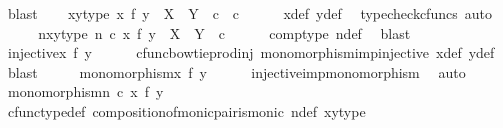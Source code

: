 \begin{isabellebody}
\ blast\isanewline
\ \ \isamarkupfalse%
\ xy{\isacharunderscore}{\kern0pt}type{\isacharcolon}{\kern0pt}\ {\isachardoublequoteopen}x\ {\isasymbowtie}\isactrlsub f\ y\ {\isacharcolon}{\kern0pt}\ X\ {\isasymCoprod}\ Y\ {\isasymrightarrow}\ {\isasymnat}\isactrlsub c\ {\isasymCoprod}\ {\isasymnat}\isactrlsub c{\isachardoublequoteclose}\isanewline
\ \ \ \ \isamarkupfalse%
\ x{\isacharunderscore}{\kern0pt}def\ y{\isacharunderscore}{\kern0pt}def\ \isamarkupfalse%
\ {\isacharparenleft}{\kern0pt}typecheck{\isacharunderscore}{\kern0pt}cfuncs{\isacharcomma}{\kern0pt}\ auto{\isacharparenright}{\kern0pt}\isanewline
\ \ \isamarkupfalse%
\ \isamarkupfalse%
\ nxy{\isacharunderscore}{\kern0pt}type{\isacharcolon}{\kern0pt}\ {\isachardoublequoteopen}n\ {\isasymcirc}\isactrlsub c\ {\isacharparenleft}{\kern0pt}x\ {\isasymbowtie}\isactrlsub f\ y{\isacharparenright}{\kern0pt}\ {\isacharcolon}{\kern0pt}\ X\ {\isasymCoprod}\ Y\ {\isasymrightarrow}\ {\isasymnat}\isactrlsub c{\isachardoublequoteclose}\isanewline
\ \ \ \ \isamarkupfalse%
\ comp{\isacharunderscore}{\kern0pt}type\ n{\isacharunderscore}{\kern0pt}def\ \isamarkupfalse%
\ blast\isanewline
\ \ \isamarkupfalse%
\ {\isachardoublequoteopen}injective{\isacharparenleft}{\kern0pt}x\ {\isasymbowtie}\isactrlsub f\ y{\isacharparenright}{\kern0pt}{\isachardoublequoteclose}\isanewline
\ \ \ \ \isamarkupfalse%
\ cfunc{\isacharunderscore}{\kern0pt}bowtieprod{\isacharunderscore}{\kern0pt}inj\ monomorphism{\isacharunderscore}{\kern0pt}imp{\isacharunderscore}{\kern0pt}injective\ x{\isacharunderscore}{\kern0pt}def\ y{\isacharunderscore}{\kern0pt}def\ \isamarkupfalse%
\ blast\isanewline
\ \ \isamarkupfalse%
\ \isamarkupfalse%
\ {\isachardoublequoteopen}monomorphism{\isacharparenleft}{\kern0pt}x\ {\isasymbowtie}\isactrlsub f\ y{\isacharparenright}{\kern0pt}{\isachardoublequoteclose}\isanewline
\ \ \ \ \isamarkupfalse%
\ injective{\isacharunderscore}{\kern0pt}imp{\isacharunderscore}{\kern0pt}monomorphism\ \isamarkupfalse%
\ auto\isanewline
\ \ \isamarkupfalse%
\ \isamarkupfalse%
\ {\isachardoublequoteopen}monomorphism{\isacharparenleft}{\kern0pt}n\ {\isasymcirc}\isactrlsub c\ {\isacharparenleft}{\kern0pt}x\ {\isasymbowtie}\isactrlsub f\ y{\isacharparenright}{\kern0pt}{\isacharparenright}{\kern0pt}{\isachardoublequoteclose}\isanewline
\ \ \ \ \isamarkupfalse%
\ cfunc{\isacharunderscore}{\kern0pt}type{\isacharunderscore}{\kern0pt}def\ composition{\isacharunderscore}{\kern0pt}of{\isacharunderscore}{\kern0pt}monic{\isacharunderscore}{\kern0pt}pair{\isacharunderscore}{\kern0pt}is{\isacharunderscore}{\kern0pt}monic\ n{\isacharunderscore}{\kern0pt}def\ xy{\isacharunderscore}{\kern0pt}type\ \isamarkupfalse%

\end{isabellebody}
